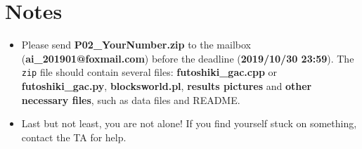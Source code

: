 ﻿\documentclass[a4paper, 11pt]{article}
\begin{document}
\section{Notes}
\begin{itemize}

\item Please send \textbf{P02\_YourNumber.zip} to the mailbox (\textbf{ai\_201901@foxmail.com}) before the deadline (\textbf{2019/10/30 23:59}). The \texttt{zip} file should contain several files: \textbf{futoshiki\_gac.cpp} or \textbf{futoshiki\_gac.py}, \textbf{blocksworld.pl}, \textbf{results pictures} and \textbf{other necessary files}, such as data files and README. 
\item Last but not least, you are not alone! If you find yourself stuck on something, contact the TA for help.

\end{itemize}



%
%
\end{document}
